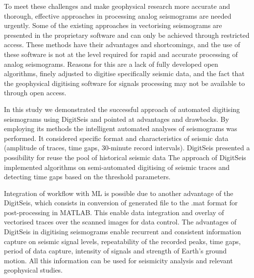 \documentclass[sensors,article,submit,moreauthors,pdftex]{Definitions/mdpi}
\begin{document}
To meet these challenges and make geophysical research more accurate and thorough, effective approaches in processing analog seismograms are needed urgently. Some of the existing approaches in vectorising seismograms are presented in the proprietary software and can only be achieved through restricted access. These methods have their advantages and shortcomings, and the use of these software is not at the level required for rapid and accurate processing of analog seismograms. Reasons for this are a lack of fully developed open algorithms, finely adjusted to digitise specifically seismic data, and the fact that the geophysical digitising software for signals processing may not be available to through open access. 

In this study we demonstrated the successful approach of automated digitising seismograms using DigitSeis and pointed at advantages and drawbacks. By employing its methods the intelligent automated analyses of seismograms was performed. It considered specific format and characteristics of seismic data (amplitude of traces, time gaps, 30-minute record intervals). DigitSeis presented a possibility for reuse the pool of historical seismic data The approach of DigitSeis implemented algorithms on semi-automated digitising of seismic traces and detecting time gaps based on the threshold parameters. 

Integration of workflow with \ac{ML} is possible due to another advantage of the DigitSeis, which consists in conversion of generated file to the .mat format for post-processing in MATLAB. This enable data integration and overlay of vectorised traces over the scanned images for data control. The advantages of DigitSeis in digitising seismograms enable recurrent and consistent information capture on seismic signal levels, repeatability of the recorded peaks, time gaps, period of data capture, intensity of signals and strength of Earth's ground motion. All this information can be used for seismicity analysis and relevant geophysical studies. 

\vspace{6pt} 

\end{document}
